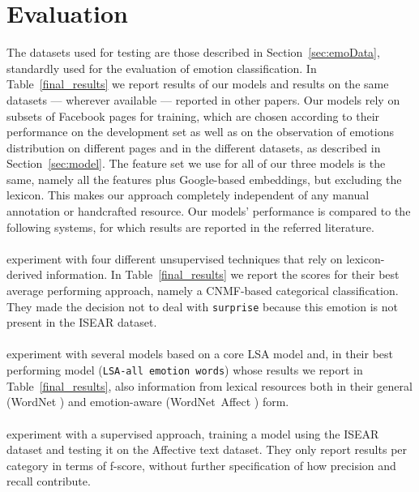 \documentclass[11pt]{article}
\begin{document}


\section{Evaluation}
\label{sec:evaluation}
The datasets used for testing are those described in Section~\ref{sec:emoData}, standardly used for the evaluation of emotion classification.
In Table~\ref{final_results} we report results of our models and results on the same datasets --- wherever available --- reported in other papers. Our models rely on subsets of Facebook pages for training, which are chosen according to their performance on the development set as well as on the observation of emotions distribution on different pages and in the different datasets, as described in Section~\ref{sec:model}. The feature set we use for all of our three models is the same, namely all the features plus Google-based embeddings, but excluding the lexicon. This makes our approach completely independent of any manual annotation or handcrafted resource. Our models' performance is compared to the following systems, for which results are reported in the referred literature. 


\paragraph{} experiment with four different unsupervised techniques that rely on lexicon-derived information. In Table~\ref{final_results} we report the scores for their best average performing approach, namely a CNMF-based categorical classification. They made the decision not to deal with \texttt{surprise} because this emotion is not present in the ISEAR dataset.


\paragraph{} experiment with several models based on a core LSA model and, in their best performing model (\texttt{LSA-all emotion words}) whose results we report in Table~\ref{final_results}, also information from lexical resources both in their general (WordNet \cite{wordnet}) and emotion-aware (WordNet~Affect \cite{strapparava2004wordnet}) form. 


\paragraph{} experiment with a supervised approach, training a model using the ISEAR dataset and testing it on the Affective text dataset. They only report results per category in terms of f-score, without further specification of how precision and recall contribute.
\end{document}
